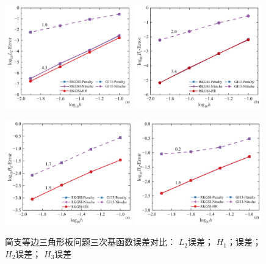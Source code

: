 \begin{figure}[H]
    \centering
    \begin{subcaptiongroup}
    \includegraphics[width=0.49\textwidth]{figure/PHR/T/CL2.png}
    \label{CL2}
    \includegraphics[width=0.49\textwidth]{figure/PHR/T/CH1.png}
    \label{CH1}
    \end{subcaptiongroup}
    \begin{subcaptiongroup}
    \includegraphics[width=0.49\textwidth]{figure/PHR/T/CH2.png}
    \label{CH2}
    \includegraphics[width=0.49\textwidth]{figure/PHR/T/CH3.png}
    \label{CH3}
    \end{subcaptiongroup}
\caption{简支等边三角形板问题三次基函数误差对比： $L_2$误差； $H_1$；误差；$H_2$误差； $H_3$误差}
\label{TCLH}
\end{figure}
